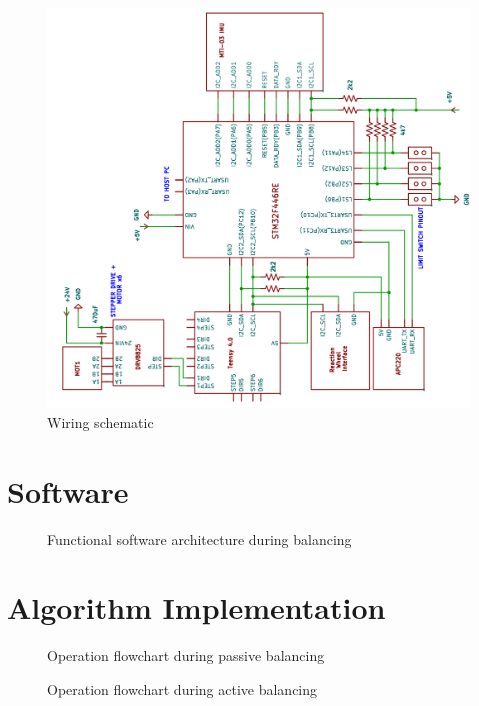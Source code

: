 \begin{figure}[h]\label{fig:wiring}
    \centering
    \includegraphics[width=0.95\linewidth,angle=-90]{figures/wiring.png}
    \caption{Wiring schematic}
\end{figure}




\section{Software}

\begin{figure}
    \centering
    
    \caption{Functional software architecture during balancing}
    \label{fig:software_flowchart}
\end{figure}




\section{Algorithm Implementation}

\begin{figure}
    \centering
    
    \caption{Operation flowchart during passive balancing}
    \label{fig:sys_arch_passive}
\end{figure}

\begin{figure}
    \centering
    
    \caption{Operation flowchart during active balancing}
    \label{fig:sys_arch_active}
\end{figure}




